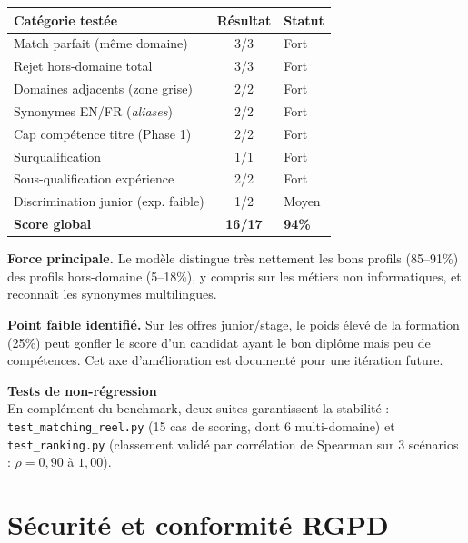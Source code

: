 \documentclass[12pt,a4paper]{report}
\newenvironment{infobox}[1][]{%
  \begin{framed}\noindent\textbf{\textcolor{navyblue}{#1}}\\[2pt]%
}{\end{framed}}
\newcommand{\filepath}[1]{\texttt{\small\textcolor{codeblue}{#1}}}
\begin{document}
\begin{center}
\begin{tabularx}{\textwidth}{Xcl}
\toprule
\textbf{Catégorie testée} & \textbf{Résultat} & \textbf{Statut} \\
\midrule
Match parfait (même domaine)        & 3/3 & Fort \\
Rejet hors-domaine total            & 3/3 & Fort \\
Domaines adjacents (zone grise)     & 2/2 & Fort \\
Synonymes EN/FR (\textit{aliases})  & 2/2 & Fort \\
Cap compétence titre (Phase 1)      & 2/2 & Fort \\
Surqualification                    & 1/1 & Fort \\
Sous-qualification expérience       & 2/2 & Fort \\
Discrimination junior (exp. faible) & 1/2 & Moyen \\
\midrule
\textbf{Score global}               & \textbf{16/17} & \textbf{94\%} \\
\bottomrule
\end{tabularx}
\end{center}

\textbf{Force principale.} Le modèle distingue très nettement les bons profils
(85–91\%) des profils hors-domaine (5–18\%), y compris sur les métiers non
informatiques, et reconnaît les synonymes multilingues.

\textbf{Point faible identifié.} Sur les offres junior/stage, le poids élevé de la
formation (25\%) peut gonfler le score d'un candidat ayant le bon diplôme mais peu de
compétences. Cet axe d'amélioration est documenté pour une itération future.

\begin{infobox}[Tests de non-régression]
En complément du benchmark, deux suites garantissent la stabilité :
\filepath{test\_matching\_reel.py} (15 cas de scoring, dont 6 multi-domaine) et
\filepath{test\_ranking.py} (classement validé par corrélation de Spearman sur
3 scénarios : $\rho = 0{,}90$ à $1{,}00$).
\end{infobox}

\chapter{Sécurité et conformité RGPD}
\end{document}
